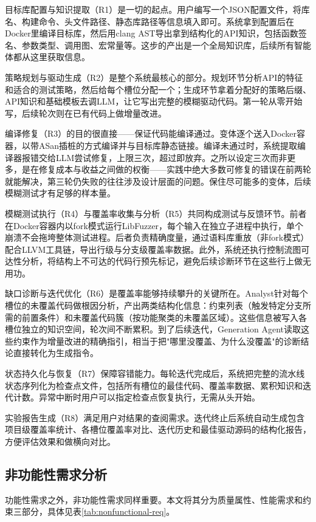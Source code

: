 目标库配置与知识提取（R1）是一切的起点。用户编写一个JSON配置文件，将库名、构建命令、头文件路径、静态库路径等信息填入即可。系统拿到配置后在Docker里编译目标库，然后用clang AST导出拿到结构化的API知识，包括函数签名、参数类型、调用图、宏常量等。这步的产出是一个全局知识库，后续所有智能体都从这里获取信息。

策略规划与驱动生成（R2）是整个系统最核心的部分。规划环节分析API的特征和适合的测试策略，然后给每个槽位分配一个；生成环节拿着分配好的策略后缀、API知识和基础模板去调LLM，让它写出完整的模糊驱动代码。第一轮从零开始写，后续轮次则在已有代码上做增量改进。

编译修复（R3）的目的很直接——保证代码能编译通过。变体逐个送入Docker容器，以带ASan插桩的方式编译并与目标库静态链接。编译未通过时，系统提取编译器报错交给LLM尝试修复，上限三次，超过即放弃。之所以设定三次而非更多，是在修复成本与收益之间做的权衡——实践中绝大多数可修复的错误在前两轮就能解决，第三轮仍失败的往往涉及设计层面的问题。保住尽可能多的变体，后续模糊测试才有足够的样本量。

模糊测试执行（R4）与覆盖率收集与分析（R5）共同构成测试与反馈环节。前者在Docker容器内以fork模式运行LibFuzzer，每个输入在独立子进程中执行，单个崩溃不会拖垮整体测试进程。后者负责精确度量，通过语料库重放（非fork模式）配合LLVM工具链，导出行级与分支级覆盖率数据。此外，系统还执行控制流图可达性分析，将结构上不可达的代码行预先标记，避免后续诊断环节在这些行上做无用功。

缺口诊断与迭代优化（R6）是覆盖率能够持续攀升的关键所在。Analyst针对每个槽位的未覆盖代码做根因分析，产出两类结构化信息：约束列表（触发特定分支所需的前置条件）和未覆盖代码簇（按功能聚类的未覆盖区域）。这些信息被写入各槽位独立的知识空间，轮次间不断累积。到了后续迭代，Generation Agent读取这些约束作为增量改进的精确指引，相当于把"哪里没覆盖、为什么没覆盖"的诊断结论直接转化为生成指令。

状态持久化与恢复（R7）保障容错能力。每轮迭代完成后，系统把完整的流水线状态序列化为检查点文件，包括所有槽位的最佳代码、覆盖率数据、累积知识和迭代计数。异常中断时用户可以指定检查点恢复执行，无需从头开始。

实验报告生成（R8）满足用户对结果的查阅需求。迭代终止后系统自动生成包含项目级覆盖率统计、各槽位覆盖率对比、迭代历史和最佳驱动源码的结构化报告，方便评估效果和做横向对比。

\subsection{非功能性需求分析}

功能性需求之外，非功能性需求同样重要。本文将其分为质量属性、性能需求和约束三部分，具体见表\ref{tab:nonfunctional-req}。

